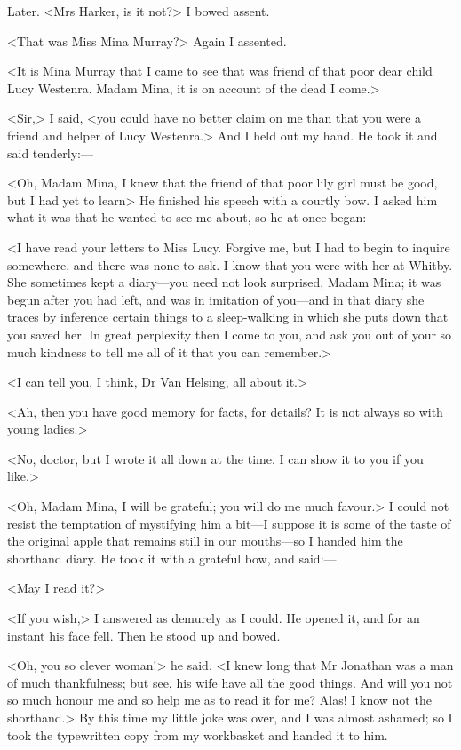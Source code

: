 \begin{diary}{Later.}
<Mrs Harker, is it not?> I bowed assent.

<That was Miss Mina Murray?> Again I assented.

<It is Mina Murray that I came to see that was friend of that poor dear child Lucy Westenra. Madam Mina, it is on account of the dead I come.>

<Sir,> I said, <you could have no better claim on me than that you were a friend and helper of Lucy Westenra.> And I held out my hand. He took it and said tenderly:—

<Oh, Madam Mina, I knew that the friend of that poor lily girl must be good, but I had yet to learn\longdash> He finished his speech with a courtly bow. I asked him what it was that he wanted to see me about, so he at once began:—

<I have read your letters to Miss Lucy. Forgive me, but I had to begin to inquire somewhere, and there was none to ask. I know that you were with her at Whitby. She sometimes kept a diary—you need not look surprised, Madam Mina; it was begun after you had left, and was in imitation of you—and in that diary she traces by inference certain things to a sleep-walking in which she puts down that you saved her. In great perplexity then I come to you, and ask you out of your so much kindness to tell me all of it that you can remember.>

<I can tell you, I think, Dr Van Helsing, all about it.>

<Ah, then you have good memory for facts, for details? It is not always so with young ladies.>

<No, doctor, but I wrote it all down at the time. I can show it to you if you like.>

<Oh, Madam Mina, I will be grateful; you will do me much favour.> I could not resist the temptation of mystifying him a bit—I suppose it is some of the taste of the original apple that remains still in our mouths—so I handed him the shorthand diary. He took it with a grateful bow, and said:—

<May I read it?>

<If you wish,> I answered as demurely as I could. He opened it, and for an instant his face fell. Then he stood up and bowed.

<Oh, you so clever woman!> he said. <I knew long that Mr Jonathan was a man of much thankfulness; but see, his wife have all the good things. And will you not so much honour me and so help me as to read it for me? Alas! I know not the shorthand.> By this time my little joke was over, and I was almost ashamed; so I took the typewritten copy from my workbasket and handed it to him.


\end{diary}

